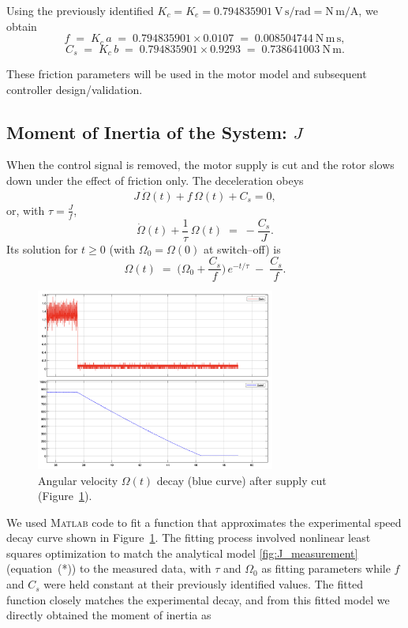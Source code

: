\documentclass{rapportCS}
\begin{document}
Using the previously identified $K_c = K_e = 0.794835901~\mathrm{V\,s/rad} = \mathrm{N\,m/A}$, we obtain
\[
f \;=\; K_c\,a \;=\; 0.794835901 \times 0.0107 \;=\; \mathbf{0.008504744}~\mathrm{N\,m\,s},
\]
\[
C_s \;=\; K_c\,b \;=\; 0.794835901 \times 0.9293 \;=\; \mathbf{0.738641003}~\mathrm{N\,m}.
\]

These friction parameters will be used in the motor model and subsequent controller design/validation.

\subsection{Moment of Inertia of the System: $J$}

When the control signal is removed, the motor supply is cut and the rotor slows down under the effect of friction only. The deceleration obeys
\[
J\,\dot{\Omega}(t) + f\,\Omega(t) + C_s = 0,
\]
or, with $\tau=\tfrac{J}{f}$,
\[
\dot{\Omega}(t) + \frac{1}{\tau}\,\Omega(t) \;=\; -\frac{C_s}{J}.
\]
Its solution for $t\ge 0$ (with $\Omega_0=\Omega(0)$ at switch--off) is
\[
\Omega(t) \;=\; \Big(\Omega_0 + \frac{C_s}{f}\Big)\,e^{-t/\tau} \;-\; \frac{C_s}{f}.
\tag{*}
\]

\begin{figure}[H]
\centering
\includegraphics[width=0.7\textwidth]{figures/signal_removed.png}
\caption{Angular velocity $\Omega(t)$ decay (blue curve) after supply cut (Figure~\ref{fig:J_measurement}).}
\label{fig:J_measurement}
\end{figure}

\noindent
We used \textsc{Matlab} code to fit a function that approximates the experimental speed decay curve shown in Figure~\ref{fig:J_measurement}. The fitting process involved nonlinear least squares optimization to match the analytical model \eqref{fig:J_measurement} (equation~(*)) to the measured data, with $\tau$ and $\Omega_0$ as fitting parameters while $f$ and $C_s$ were held constant at their previously identified values. The fitted function closely matches the experimental decay, and from this fitted model we directly obtained the moment of inertia as
\end{document}
